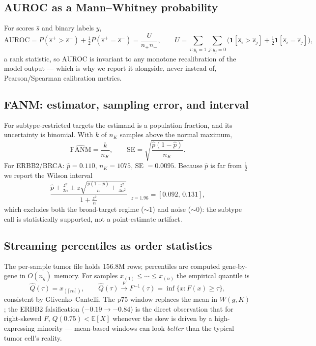 \subsection{AUROC as a Mann--Whitney probability}
For scores $\hat s$ and binary labels $y$,
\begin{equation}
\mathrm{AUROC}=P(\hat s^+>\hat s^-)+\tfrac12 P(\hat s^+=\hat s^-)=\frac{U}{n_+n_-},\qquad
U=\textstyle\sum_{i:y_i=1}\sum_{j:y_j=0}\big(\mathbf 1[\hat s_i>\hat s_j]+\tfrac12\mathbf 1[\hat s_i=\hat s_j]\big),
\end{equation}
a rank statistic, so AUROC is invariant to any monotone recalibration of the model output --- which is why we report it alongside, never instead of, Pearson/Spearman calibration metrics.

\subsection{FANM: estimator, sampling error, and interval}
For subtype-restricted targets the estimand is a population fraction, and its
uncertainty is binomial. With $k$ of $n_K$ samples above the normal maximum,
\begin{equation}
\widehat{\mathrm{FANM}}=\frac{k}{n_K},\qquad
\mathrm{SE}=\sqrt{\frac{\hat p(1-\hat p)}{n_K}} .
\end{equation}
For ERBB2/BRCA: $\hat p=0.110$, $n_K=1075$, SE $=0.0095$. Because $\hat p$ is
far from $\tfrac12$ we report the Wilson interval
\begin{equation}
\frac{\hat p+\frac{z^2}{2n}\pm z\sqrt{\frac{\hat p(1-\hat p)}{n}+\frac{z^2}{4n^2}}}{1+\frac{z^2}{n}}
\;\Big|_{z=1.96}
=[0.092,\,0.131],
\end{equation}
which excludes both the broad-target regime ($\sim$1) and noise ($\sim$0): the subtype call is statistically supported, not a point-estimate artifact.

\subsection{Streaming percentiles as order statistics}
The per-sample tumor file holds 156.8M rows; percentiles are computed
gene-by-gene in $O(n_g)$ memory. For samples $x_{(1)}\le\cdots\le x_{(n)}$ the
empirical quantile is
\begin{equation}
\hat Q(\tau)=x_{(\lceil \tau n\rceil)},\qquad
\hat Q(\tau)\xrightarrow{p}F^{-1}(\tau)=\inf\{x:F(x)\ge\tau\},
\end{equation}
consistent by Glivenko--Cantelli. The p75 window replaces the mean in
$W(g,K)$; the ERBB2 falsification ($-0.19\to-0.84$) is the direct observation
that for right-skewed $F$, $Q(0.75)<\mathbb E[X]$ whenever the skew is driven
by a high-expressing minority --- mean-based windows can look \emph{better}
than the typical tumor cell's reality.

